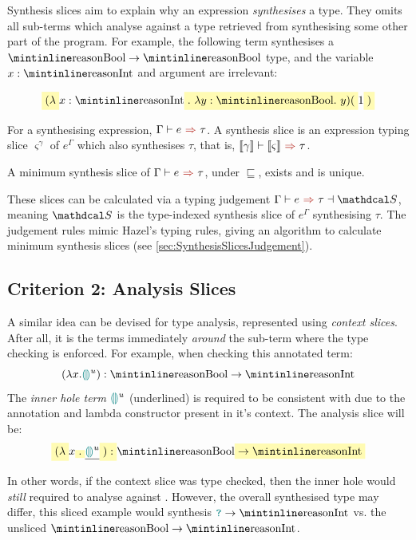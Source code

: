 Synthesis slices aim to explain why an expression \textit{synthesises} a type. They omits all sub-terms which analyse against a type retrieved from synthesising some other part of the program. For example, the following term synthesises a $\code{Bool} \to \code{Bool}$ type, and the variable $x : \code{Int}$ and argument are irrelevant:

\[\hlcmaths[yellow!30]{(\lambda} x: \code{Int}\hlcmaths[yellow!30]{.\ \lambda y : \code{Bool}.\ y)(}1\hlcmaths[yellow!30]{)}\]

\begin{definition}
For a synthesising expression, $\synthesis{e}{\tau}$. A synthesis slice is an expression typing slice $\varsigma^{\gamma}$ of $e^\Gamma$ which also synthesises $\tau$, that is, $\synthesis[\type{\gamma}]{\type{\varsigma}}{\tau}$.
\end{definition}
\begin{proposition}
A minimum synthesis slice of $\synthesis{e}{\tau}$, under $\sqsubseteq$, exists and is unique.
\end{proposition}

These slices can be calculated via a typing judgement $\synthesisslice{e}{\tau}{\S}$, meaning $\S$ is the type-indexed synthesis slice of $e^\Gamma$ synthesising $\tau$. The judgement rules mimic Hazel's typing rules, giving an algorithm to calculate minimum synthesis slices (see \cref{sec:SynthesisSlicesJudgement}).

\subsection{Criterion 2: Analysis Slices}\label{sec:AnalysisSlices}
A similar idea can be devised for type analysis, represented using \textit{context slices}. After all, it is the terms immediately \textit{around} the sub-term where the type checking is enforced. For example, when checking this annotated term:
\[(\lambda x. \hole^u) : \code{Bool} \to \code{Int}\]
The \textit{inner hole term} ${\color{teal}\llparenthesis}  {\color{teal}\rrparenthesis}^u$ (underlined) is required to be consistent with  due to the annotation and lambda constructor present in it's context. The analysis slice will be:
\[\hlcmaths[yellow!30]{(\lambda} x\hlcmaths[yellow!30]{.} \underline{\hole^u} \hlcmaths[yellow!30]{) : } \code{Bool} \hlcmaths[yellow!30]{\to \code{Int}}\]

In other words, if the context slice was type checked, then the inner hole would \textit{still} required to analyse against . However, the overall synthesised type may differ, this sliced example would synthesis $\dyn \to \code{Int}$ vs. the unsliced $\code{Bool} \to \code{Int}$.


